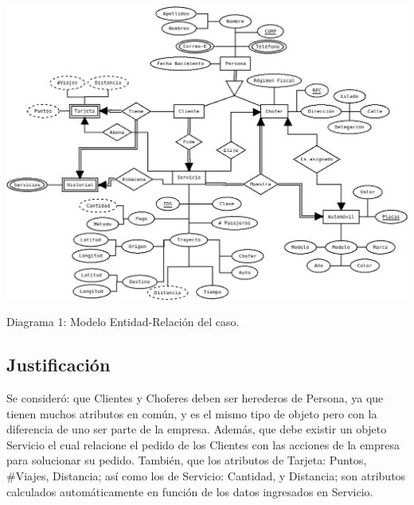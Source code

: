 \documentclass{article}
\begin{document}
       \includegraphics[width=14.7cm]{ER.png}\\
       \centerline{Diagrama 1: Modelo Entidad-Relación del caso.}

       \subsection{Justificación}

       { 
       Se consideró: que Clientes y Choferes deben ser herederos de Persona, ya que tienen muchos
       atributos en común, y es el mismo tipo de objeto pero con la diferencia de uno ser parte de
       la empresa. Además, que debe existir un objeto Servicio el cual relacione el pedido de los
       Clientes con las acciones de la empresa para solucionar su pedido. También, que los atributos
       de Tarjeta: Puntos, #Viajes, Distancia; así como los de Servicio:
       Cantidad, y Distancia; son atributos calculados automáticamente en función de los datos
       ingresados en Servicio.
       }\\
\end{document}
